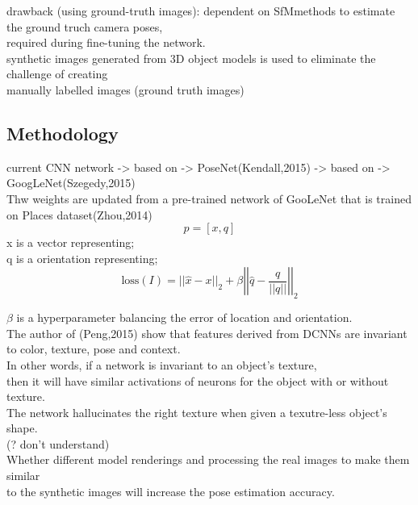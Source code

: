 \documentclass[11pt]{article}
\begin{document}
drawback (using ground-truth images): dependent on SfMmethods to estimate the ground truch camera poses, \\
required during fine-tuning the network. \\

synthetic images generated from 3D object models is used to eliminate the challenge of creating \\
manually labelled images (ground truth images) \\
\subsection{Methodology}
\label{sec-5-3}
current CNN network -> based on -> PoseNet(Kendall,2015) -> based on -> GoogLeNet(Szegedy,2015) \\

Thw weights are updated from a pre-trained network of GooLeNet that is trained on Places dataset(Zhou,2014) \\

\begin{equation}
p=[x,q]
\end{equation}
x is a vector representing; \\
q is a orientation representing; \\

\begin{equation}
\mathrm{loss}(I)=||\hat{x}-x||_2+\beta \left |\left | \hat{q}-\frac{q}{||q||} \right | \right |_2
\end{equation}

$\beta$ is a hyperparameter balancing the error of location and orientation. \\



The author of (Peng,2015) show that features derived from DCNNs are invariant to color, texture, pose and context. \\
In other words, if a network is invariant to an object's texture, \\
then it will have similar activations of neurons for the object with or without texture. \\
The network hallucinates the right texture when given a texutre-less object's shape. \\
(? don't understand) \\

Whether different model renderings and processing the real images to make them similar \\
to the synthetic images will increase the pose estimation accuracy. \\
\end{document}
